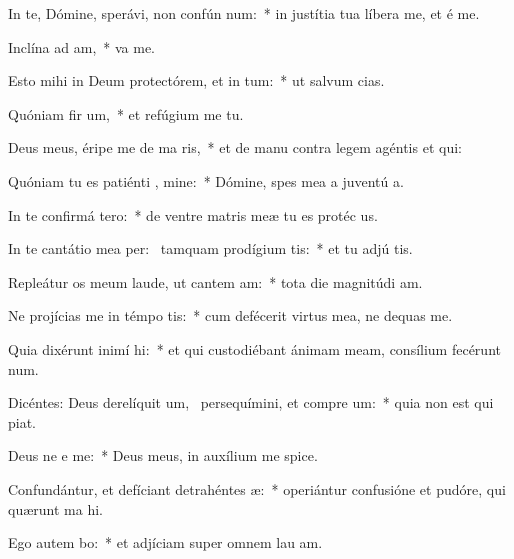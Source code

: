 \item In te, Dómine, sperávi, non confún  num:~* in justítia tua líbera me, et é me.
\item Inclína ad   am,~*  va me.
\item Esto mihi in Deum protectórem, et in  tum:~* ut salvum  cias.
\item Quóniam fir um,~* et refúgium me  tu.
\item Deus meus, éripe me de ma ris,~* et de manu contra legem agéntis et qui:
\item Quóniam tu es patiénti , mine:~* Dómine, spes mea a juventú a.
\item In te confirmá   tero:~* de ventre matris meæ tu es protéc us.
\item In te cantátio mea per:~\pscross{} tamquam prodígium   tis:~* et tu adjú tis.
\item Repleátur os meum laude, ut cantem  am:~* tota die magnitúdi am.
\item Ne projícias me in témpo tis:~* cum defécerit virtus mea, ne dequas me.
\item Quia dixérunt inimí  hi:~* et qui custodiébant ánimam meam, consílium fecérunt  num.
\item Dicéntes: Deus derelíquit um,~\pscross{} persequímini, et compre um:~* quia non est qui piat.
\item Deus ne e  me:~* Deus meus, in auxílium me spice.
\item Confundántur, et defíciant detrahéntes  æ:~* operiántur confusióne et pudóre, qui quærunt ma hi.
\item Ego autem  bo:~* et adjíciam super omnem lau am.

